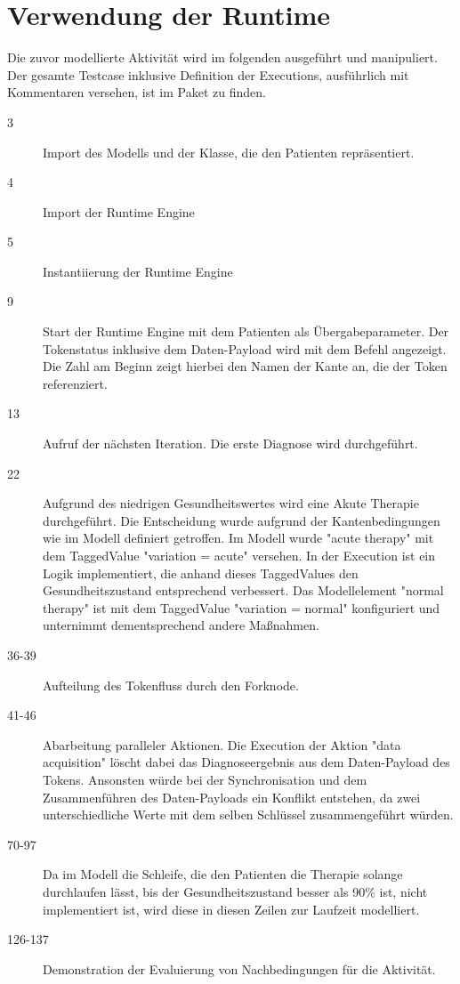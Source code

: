 \section{Verwendung der Runtime}
Die zuvor modellierte Aktivität wird im folgenden ausgeführt und manipuliert. Der gesamte Testcase inklusive Definition der Executions, ausführlich mit Kommentaren versehen, ist im Paket  zu finden.


\begin{description}
\item[3] Import des Modells und der Klasse, die den Patienten repräsentiert.
\item[4] Import der Runtime Engine
\item[5] Instantiierung der Runtime Engine
\item[9] Start der Runtime Engine mit dem Patienten als Übergabeparameter. Der Tokenstatus inklusive dem Daten-Payload wird mit dem Befehl  angezeigt. Die Zahl am Beginn zeigt hierbei den Namen der Kante an, die der Token referenziert.
\item[13] Aufruf der nächsten Iteration. Die erste Diagnose wird durchgeführt.
\item[22] Aufgrund des niedrigen Gesundheitswertes wird eine Akute Therapie durchgeführt. Die Entscheidung wurde aufgrund der Kantenbedingungen wie im Modell definiert getroffen. Im Modell wurde "acute therapy" mit dem TaggedValue "variation = acute" versehen. In der Execution ist ein Logik implementiert, die anhand dieses TaggedValues den Gesundheitszustand entsprechend verbessert. Das Modellelement "normal therapy" ist mit dem TaggedValue "variation = normal" konfiguriert und unternimmt dementsprechend andere Maßnahmen.
\item[36-39] Aufteilung des Tokenfluss durch den Forknode.
\item[41-46] Abarbeitung paralleler Aktionen. Die Execution der Aktion "data acquisition" löscht dabei das Diagnoseergebnis aus dem Daten-Payload des Tokens. Ansonsten würde bei der Synchronisation und dem Zusammenführen des Daten-Payloads ein Konflikt entstehen, da zwei unterschiedliche Werte mit dem selben Schlüssel zusammengeführt würden.
\item[70-97] Da im Modell die Schleife, die den Patienten die Therapie solange durchlaufen lässt, bis der Gesundheitszustand besser als 90\% ist, nicht implementiert ist, wird diese in diesen Zeilen zur Laufzeit modelliert.
\item[126-137] Demonstration der Evaluierung von Nachbedingungen für die Aktivität.
\end{description}

